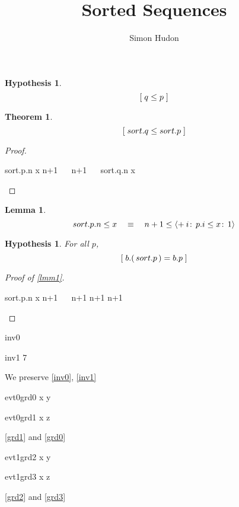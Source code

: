\documentclass[12pt]{amsart}
\title{Sorted Sequences}
\author{Simon Hudon}
\date{} %
\newcounter{thm}
\newtheorem{theorem}[thm]{Theorem}
\newtheorem{lemma}[thm]{Lemma}
\newtheorem{axiom}[thm]{Hypothesis}
\begin{document}
\maketitle
%
\begin{axiom} \label{axm0}
	\[ [\;  q \le p  \;] \]
\end{axiom}
\begin{theorem}
	\[ [\;  sort.q \le sort.p  \;] \]
\end{theorem}
\begin{proof}
\begin{calculation}
		  sort.p.n  \le  x
	\hint{=}{ \eqref{lmm1} }
		  n+1  ~\le~  
		  n+1  ~\le~ 
	\hint{=}{ \eqref{lmm1} }
		  sort.q.n \le x
\end{calculation}
\end{proof}
\begin{lemma} \label{lmm1}
	\[ sort.p.n  \le  x   \quad \equiv \quad   n+1 \le { \langle + \:i\!:\, p.i \le x\!:\, 1 \rangle } \]
\end{lemma}

\begin{axiom} \label{lmm2}
For all $p$,
	\[ [\;  b.( \, sort.p\, ) = b.p  \;] \]
\end{axiom}
\begin{proof}[Proof of \eqref{lmm1}]
\begin{calculation}
		  sort.p.n  \le  x
	\hint{=}{ \eqref{lmm3} }
		  n+1 ~\le~ 
		  n+1 \1\le {}
	\hint{=}{ \eqref{lmm2} }
		  n+1 \1\le {}
		  n+1 \1\le {}
\end{calculation}
\end{proof}
\begin{invariant}{inv0}
\end{invariant}
\begin{invariant}{inv1}
	7
\end{invariant}

We preserve \ref{inv0}, \ref{inv1}


\begin{ev:guard}{evt0}{grd0}
	x \le y
\end{ev:guard}

\begin{ev:guard}{evt0}{grd1}
	x \le z
\end{ev:guard}
\ref{grd1} and \ref{grd0}


\begin{ev:guard}{evt1}{grd2}
	x \le y
\end{ev:guard}

\begin{ev:guard}{evt1}{grd3}
	x \le z
\end{ev:guard}
\ref{grd2} and \ref{grd3}
\end{document}
